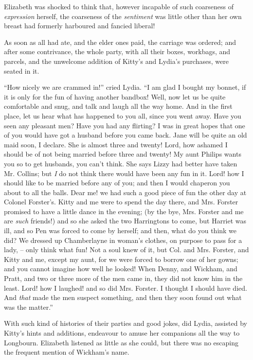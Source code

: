 Elizabeth was shocked to think that, however incapable
of such coarseness of \textit{expression} herself, the coarseness
of the \textit{sentiment} was little other than her own breast had
formerly harboured and fancied liberal!

As soon as all had ate, and the elder ones paid, the
carriage was ordered; and after some contrivance, the
whole party, with all their boxes, workbags, and parcels,
and the unwelcome addition of Kitty’s and Lydia’s
purchases, were seated in it.

“How nicely we are crammed in!” cried Lydia. “I am
glad I bought my bonnet, if it is only for the fun of having
another bandbox! Well, now let us be quite comfortable
and snug, and talk and laugh all the way home. And
in the first place, let us hear what has happened to you
all, since you went away. Have you seen any pleasant
men? Have you had any flirting? I was in great hopes
that one of you would have got a husband before you came
back. Jane will be quite an old maid soon, I declare.
She is almost three and twenty! Lord, how ashamed
I should be of not being married before three and twenty!
My aunt Philips wants you so to get husbands, you can’t
think. She says Lizzy had better have taken Mr. Collins;
but \textit{I} do not think there would have been any fun in it.
Lord! how I should like to be married before any of you;
and then I would chaperon you about to all the balls.
Dear me! we had such a good piece of fun the other day
at Colonel Forster’s. Kitty and me were to spend the
day there, and Mrs. Forster promised to have a little
dance in the evening; (by the bye, Mrs. Forster and
me are \textit{such} friends!) and so she asked the two Harringtons
to come, but Harriet was ill, and so Pen was forced to
come by herself; and then, what do you think we did?
We dressed up Chamberlayne in woman’s clothes, on
purpose to pass for a lady, -- only think what fun! Not
a soul knew of it, but Col. and Mrs. Forster, and
Kitty and me, except my aunt, for we were forced to
borrow one of her gowns; and you cannot imagine how
well he looked! When Denny, and Wickham, and Pratt,
and two or three more of the men came in, they did not
know him in the least. Lord! how I laughed! and so
did Mrs. Forster. I thought I should have died. And
\textit{that} made the men suspect something, and then they soon
found out what was the matter.”

With such kind of histories of their parties and good
jokes, did Lydia, assisted by Kitty’s hints and additions,
endeavour to amuse her companions all the way to Longbourn.
Elizabeth listened as little as she could, but there
was no escaping the frequent mention of Wickham’s
name.

